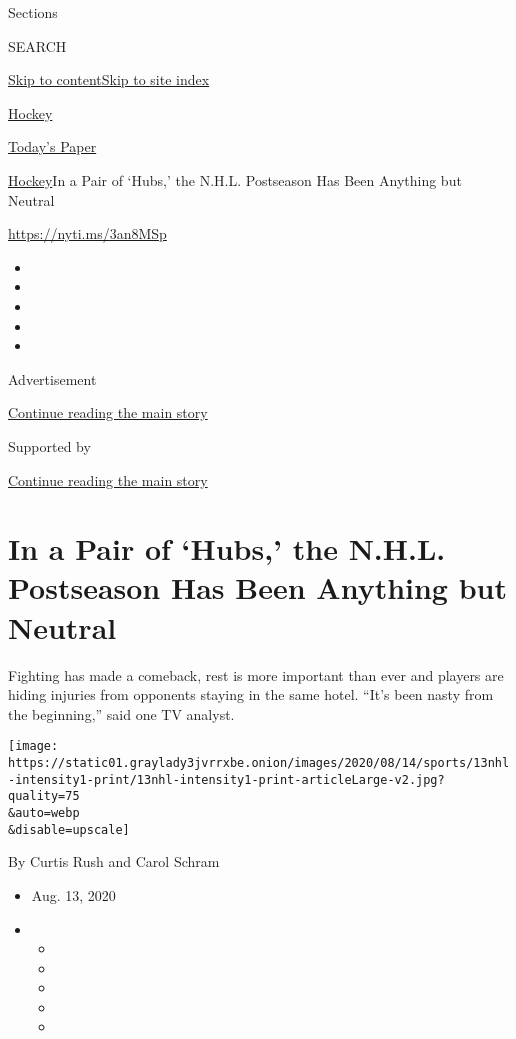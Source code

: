 Sections

SEARCH

\protect\hyperlink{site-content}{Skip to
content}\protect\hyperlink{site-index}{Skip to site index}

\href{https://www.nytimes3xbfgragh.onion/section/sports/hockey}{Hockey}

\href{https://myaccount.nytimes3xbfgragh.onion/auth/login?response_type=cookie\&client_id=vi}{}

\href{https://www.nytimes3xbfgragh.onion/section/todayspaper}{Today's
Paper}

\href{/section/sports/hockey}{Hockey}\textbar{}In a Pair of `Hubs,' the
N.H.L. Postseason Has Been Anything but Neutral

\url{https://nyti.ms/3an8MSp}

\begin{itemize}
\item
\item
\item
\item
\item
\end{itemize}

Advertisement

\protect\hyperlink{after-top}{Continue reading the main story}

Supported by

\protect\hyperlink{after-sponsor}{Continue reading the main story}

\hypertarget{in-a-pair-of-hubs-the-nhl-postseason-has-been-anything-but-neutral}{%
\section{In a Pair of `Hubs,' the N.H.L. Postseason Has Been Anything
but
Neutral}\label{in-a-pair-of-hubs-the-nhl-postseason-has-been-anything-but-neutral}}

Fighting has made a comeback, rest is more important than ever and
players are hiding injuries from opponents staying in the same hotel.
``It's been nasty from the beginning,'' said one TV analyst.

\texttt{[image: https://static01.graylady3jvrrxbe.onion/images/2020/08/14/sports/13nhl-intensity1-print/13nhl-intensity1-print-articleLarge-v2.jpg?quality=75\\\&auto=webp\\\&disable=upscale]}

By Curtis Rush and Carol Schram

\begin{itemize}
\item
  Aug. 13, 2020
\item
  \begin{itemize}
  \item
  \item
  \item
  \item
  \item
  \end{itemize}
\end{itemize}

